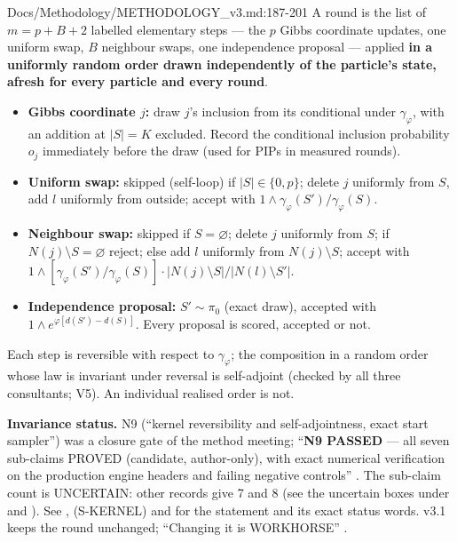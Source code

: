 \begin{stmt}{Docs/Methodology/METHODOLOGY_v3.md:187-201}
A round is the list of $m=p+B+2$ labelled elementary steps --- the $p$ Gibbs coordinate updates, one uniform swap, $B$ neighbour
swaps, one independence proposal --- applied \textbf{in a uniformly random order drawn independently of the particle's state,
afresh for every particle and every round}.
\begin{itemize}
\item \textbf{Gibbs coordinate $j$:} draw $j$'s inclusion from its conditional under $\gamma_\varphi$, with an addition at $|S|=K$
  excluded. Record the conditional inclusion probability $o_j$ immediately before the draw (used for PIPs in measured rounds).
\item \textbf{Uniform swap:} skipped (self-loop) if $|S|\in\{0,p\}$; delete $j$ uniformly from $S$, add $l$ uniformly from outside;
  accept with $1\wedge\gamma_\varphi(S')/\gamma_\varphi(S)$.
\item \textbf{Neighbour swap:} skipped if $S=\varnothing$; delete $j$ uniformly from $S$; if $N(j)\setminus S=\varnothing$ reject;
  else add $l$ uniformly from $N(j)\setminus S$; accept with
  $1\wedge[\gamma_\varphi(S')/\gamma_\varphi(S)]\cdot|N(j)\setminus S|/|N(l)\setminus S'|$.
\item \textbf{Independence proposal:} $S'\sim\pi_0$ (exact draw), accepted with $1\wedge e^{\varphi[d(S')-d(S)]}$. Every proposal is
  scored, accepted or not.
\end{itemize}
Each step is reversible with respect to $\gamma_\varphi$; the composition in a random order whose law is invariant under reversal is
self-adjoint (checked by all three consultants; V5). An individual realised order is not.
\end{stmt}

\textbf{Invariance status.} N9 (``kernel reversibility and self-adjointness, exact start sampler'') was a closure gate of
the method meeting; ``\textbf{N9 PASSED} --- all seven sub-claims PROVED (candidate, author-only), with exact numerical
verification on the production engine headers and failing negative controls''
. The sub-claim count is UNCERTAIN: other records give 7  and 8  (see the uncertain boxes under  and ). See ,  (S-KERNEL) and  for the statement
and its exact status words. v3.1 keeps the round unchanged; ``Changing it is WORKHORSE''
.

